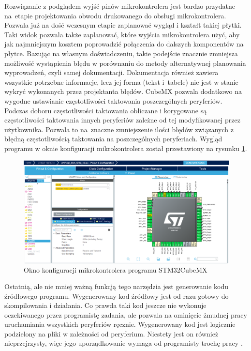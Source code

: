 Rozwiązanie z podglądem wyjść pinów mikrokontrolera jest bardzo przydatne na~etapie projektowania obwodu drukowanego do obsługi mikrokontrolera. Pozwala już na dość wczesnym etapie zaplanować wygląd i kształt takiej płytki. Taki widok pozwala także zaplanować, które wyjścia mikrokontrolera użyć, aby jak najmniejszym kosztem poprowadzić połączenia do dalszych komponentów na płytce. Bazując na własnym doświadczeniu, takie podejście znacznie zmniejsza możliwość wystąpienia błędu w porównaniu do metody alternatywnej planowania wyprowadzeń, czyli samej dokumentacji. Dokumentacja również zawiera wszystkie potrzebne informacje, lecz jej forma (tekst i~tabele) nie jest w stanie wykryć wykonanych przez projektanta błędów. CubeMX pozwala dodatkowo na wygodne ustawianie częstotliwości taktowania poszczególnych peryferiów. Podczas doboru częstotliwości taktowania obliczane i korygowane są częstotliwości taktowania innych peryferiów zależne od tej modyfikowanej przez użytkownika. Pozwala to na~znaczne zmniejszenie ilości błędów związanych z błędną częstotliwością taktowania na poszczególnych peryferiach. Wygląd programu w oknie konfiguracji mikrokontrolera został przestawiony na rysunku \ref{f_cube_konf}.

\begin{figure}[!h]
    \centering
    \includegraphics[width=0.95\linewidth]{img/cube_config.png}
    \caption{Okno konfiguracji mikrokontrolera programu STM32CubeMX} 

  \label{f_cube_konf}
\end{figure}

Ostatnią, ale nie mniej ważną funkcją tego narzędzia jest generowanie kodu źródłowego programu. Wygenerowany kod źródłowy jest od razu gotowy do skompilowania i działania. Co prawda taki kod jeszcze nie wykonuje oczekiwanego przez programistę zadania, ale pozwala na ominięcie żmudnej pracy uruchamiania wszystkich peryferiów ręcznie. Wygenerowany kod jest logicznie podzielony na pliki w zależności od peryferium. Niestety jest on również nieprzejrzysty, więc jego uporządkowanie wymaga od programisty trochę pracy \cite{b_site_cube}.

